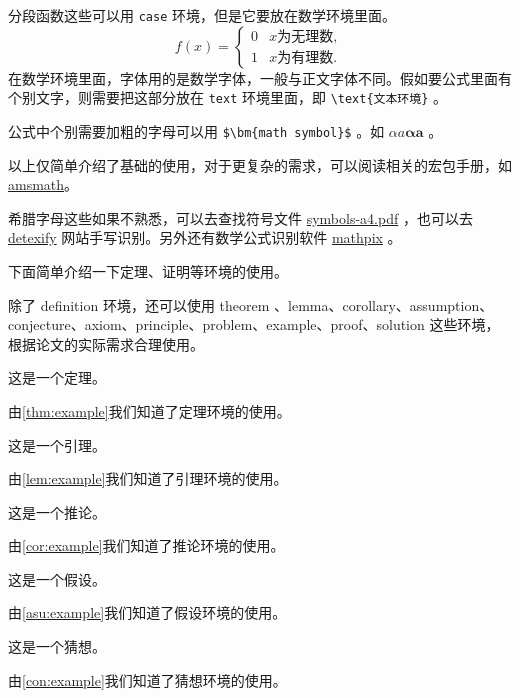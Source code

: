 \documentclass[withoutpreface,bwprint]{cumcmthesis}
\begin{document}
分段函数这些可以用 \verb|case| 环境，但是它要放在数学环境里面。
\[
    f(x) =
    \begin{cases}
        0 & x \text{为无理数} , \\
        1 & x \text{为有理数} .
    \end{cases}
\]
在数学环境里面，字体用的是数学字体，一般与正文字体不同。假如要公式里面有个别文字，则需要把这部分放在 \verb|text| 环境里面，即 \verb|\text{文本环境}| 。

公式中个别需要加粗的字母可以用 \verb|$\bm{math symbol}$| 。如 $ \alpha a\bm{\alpha a} $ 。

以上仅简单介绍了基础的使用，对于更复杂的需求，可以阅读相关的宏包手册，如 \href{http://texdoc.net/texmf-dist/doc/latex/amsmath/amsldoc.pdf}{amsmath}。

希腊字母这些如果不熟悉，可以去查找符号文件 \href{http://mirrors.ctan.org/info/symbols/comprehensive/symbols-a4.pdf}{symbols-a4.pdf} ，也可以去 \href{http://detexify.kirelabs.org/classify.html}{detexify} 网站手写识别。另外还有数学公式识别软件 \href{https://mathpix.com/}{mathpix} 。

下面简单介绍一下定理、证明等环境的使用。

除了 definition 环境，还可以使用 theorem 、lemma、corollary、assumption、conjecture、axiom、principle、problem、example、proof、solution 这些环境，根据论文的实际需求合理使用。

\begin{theorem}
    这是一个定理。
    \label{thm:example}
\end{theorem}
由\cref{thm:example}我们知道了定理环境的使用。

\begin{lemma}
    这是一个引理。
    \label{lem:example}
\end{lemma}
由\cref{lem:example}我们知道了引理环境的使用。

\begin{corollary}
    这是一个推论。
    \label{cor:example}
\end{corollary}
由\cref{cor:example}我们知道了推论环境的使用。

\begin{assumption}
    这是一个假设。
    \label{asu:example}
\end{assumption}
由\cref{asu:example}我们知道了假设环境的使用。

\begin{conjecture}
    这是一个猜想。
    \label{con:example}
\end{conjecture}
由\cref{con:example}我们知道了猜想环境的使用。
\end{document}
